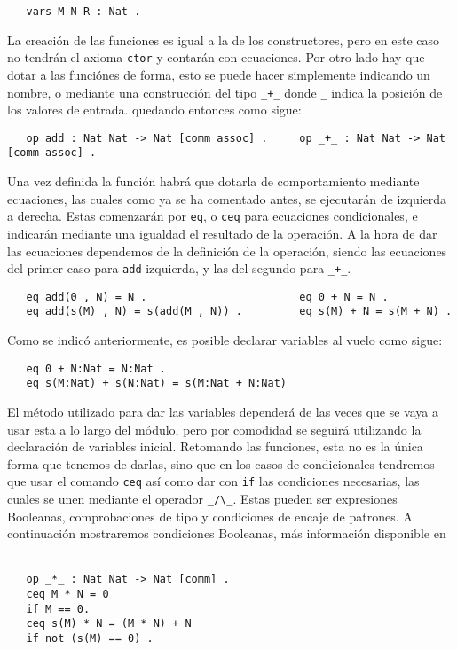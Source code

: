 {\codesize
\begin{verbatim}
   vars M N R : Nat .
\end{verbatim}
}

La creación de las funciones es igual a la de los constructores, pero en este caso no tendrán el axioma \texttt{ctor} y contarán con ecuaciones. Por otro lado hay que dotar a las funciónes de forma, esto se puede hacer simplemente indicando un nombre, o mediante una construcción del tipo \verb"_+_" donde \verb"_" indica la posición de los valores de entrada. quedando entonces como sigue: \par

{\codesize
\begin{verbatim}
   op add : Nat Nat -> Nat [comm assoc] .     op _+_ : Nat Nat -> Nat [comm assoc] .
\end{verbatim}
}

Una vez definida la función habrá que dotarla de comportamiento mediante ecuaciones, las cuales como ya se ha comentado antes, se ejecutarán de izquierda a derecha. Estas comenzarán por \texttt{eq}, o \texttt{ceq} para ecuaciones condicionales, e indicarán mediante una igualdad el resultado de la operación. A la hora de dar las ecuaciones dependemos de la definición de la operación, siendo las ecuaciones del primer caso para \verb"add" izquierda, y las del segundo para \verb"_+_". \par
{\codesize
\begin{verbatim}
   eq add(0 , N) = N .                        eq 0 + N = N .
   eq add(s(M) , N) = s(add(M , N)) .         eq s(M) + N = s(M + N) .
\end{verbatim}
}

Como se indicó anteriormente, es posible declarar variables al vuelo como sigue: \par
{\codesize
\begin{verbatim}
   eq 0 + N:Nat = N:Nat .
   eq s(M:Nat) + s(N:Nat) = s(M:Nat + N:Nat) 
\end{verbatim}
}
 
El método utilizado para dar las variables dependerá de las veces que se vaya a usar esta a lo largo del módulo, pero por comodidad se seguirá utilizando la declaración de variables inicial. Retomando las funciones, esta no es la única forma que tenemos de darlas, sino que en los casos de condicionales tendremos que usar el comando \texttt{ceq} así como dar con \texttt{if} las condiciones necesarias, las cuales se unen mediante el operador \verb"_/\_". Estas pueden ser expresiones Booleanas, comprobaciones de tipo y condiciones de encaje de patrones. A continuación mostraremos condiciones Booleanas, más información disponible en ~\cite{maudeBook}
{\codesize
\begin{verbatim}
   op _*_ : Nat Nat -> Nat [comm] .
   ceq M * N = 0 
   if M == 0.
   ceq s(M) * N = (M * N) + N
   if not (s(M) == 0) .
\end{verbatim}
}

